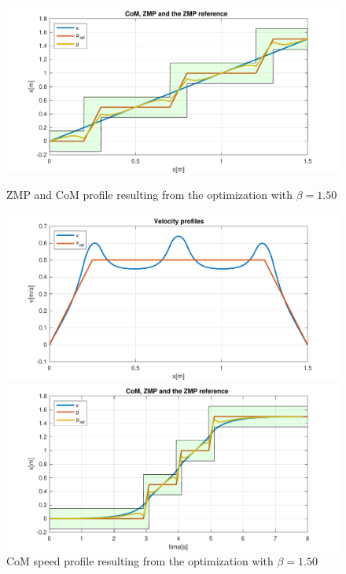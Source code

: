 \documentclass[a4paper]{article}
\begin{document}
 \newpage
\begin{figure}
     \begin{minipage}[b]{0.48\textwidth}
       \centering
         \includegraphics[scale=0.4]{plot/SQD/150/x_opt_150.pdf}
         \caption{ZMP and CoM profile resulting from the optimization with $\beta=1.50$} 
         \label{fig:opt_x_150_space}
     \end{minipage}
    \hfill
     \begin{minipage}[b]{0.48\textwidth}
         \centering
        \includegraphics[scale=0.4]{plot/SQD/150/vx_opt_150.pdf} 
        \caption{CoM speed profile resulting from the optimization with  $\beta=1.50$} 
        \label{fig:opt_vx_150_space}
     \end{minipage}   
     \vfill  
     \begin{minipage}[b]{0.48\textwidth}
         \centering
        \includegraphics[scale=0.4]{plot/SQD/150/x_time_150.pdf} 

\end{minipage}
\end{figure}
\end{document}
